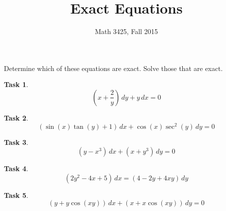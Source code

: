 \documentclass[11pt]{amsart}
\theoremstyle{definition}
\newtheorem{task}{Task}
\begin{document}
\title{Exact Equations}
\author{Math 3425, Fall 2015}

\maketitle

Determine which of these equations are exact. Solve those that are exact.

\begin{task}
$$
\left( x + \dfrac{2}{y}\right) \, dy + y\, dx = 0
$$
\end{task}

\begin{task}
$$
(\sin(x)\tan(y)+1)\, dx + \cos(x)\sec^2(y)\, dy = 0
$$
\end{task}

\begin{task}
$$
(y-x^3)\, dx + (x+y^3)\, dy = 0
$$
\end{task}


\begin{task}
$$
(2y^2-4x+5)\, dx = (4-2y+4xy)\, dy
$$
\end{task}


\begin{task}
$$
(y+y\cos(xy))\, dx + (x+x\cos(xy))\, dy = 0
$$
\end{task}
\end{document}
